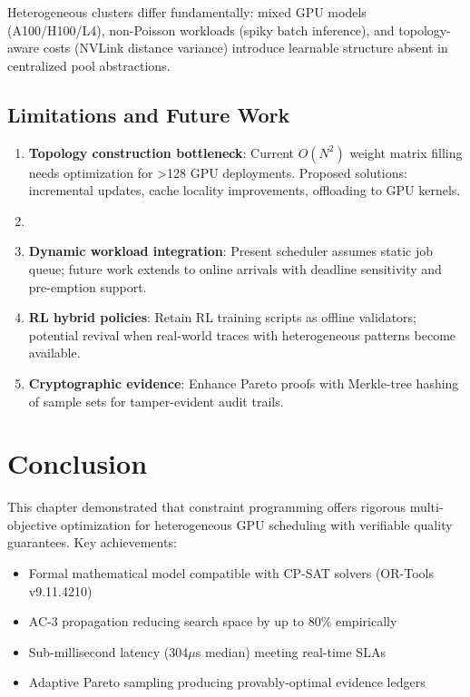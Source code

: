 \documentclass[11pt, twoside]{article}
\begin{document}
Heterogeneous clusters differ fundamentally: mixed GPU models (A100/H100/L4), non-Poisson workloads (spiky batch inference), and topology-aware costs (NVLink distance variance) introduce learnable structure absent in centralized pool abstractions.

\subsection{Limitations and Future Work}

\begin{enumerate}
\item \textbf{Topology construction bottleneck}: Current $O(N^2)$ weight matrix filling needs optimization for >128 GPU deployments. Proposed solutions: incremental updates, cache locality improvements, offloading to GPU kernels.
\item \item \textbf{Dynamic workload integration}: Present scheduler assumes static job queue; future work extends to online arrivals with deadline sensitivity and pre-emption support.
\item \textbf{RL hybrid policies}: Retain RL training scripts as offline validators; potential revival when real-world traces with heterogeneous patterns become available.
\item \textbf{Cryptographic evidence}: Enhance Pareto proofs with Merkle-tree hashing of sample sets for tamper-evident audit trails.
\end{enumerate}

\section{Conclusion}

This chapter demonstrated that constraint programming offers rigorous multi-objective optimization for heterogeneous GPU scheduling with verifiable quality guarantees. Key achievements:
\begin{itemize}
\item Formal mathematical model compatible with CP-SAT solvers (OR-Tools v9.11.4210)
\item AC-3 propagation reducing search space by up to 80\% empirically
\item Sub-millisecond latency (304$\mu$s median) meeting real-time SLAs
\item Adaptive Pareto sampling producing provably-optimal evidence ledgers
\end{itemize}
\end{document}
